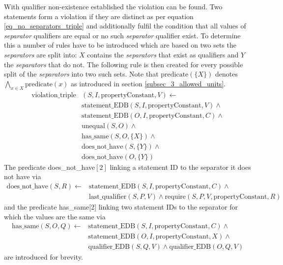 \documentclass[hyperref,bachelorofscience,fleqn]{cgvpub}
\begin{document}
With qualifier non-existence established the violation can be found. Two statements form a violation if they are distinct as per equation \ref{eq_no_separators_triple} and additionally fulfil the condition that all values of \emph{separator} qualifiers are equal or no such \emph{separator} qualifier exist. To determine this a number of rules have to be introduced which are based on two sets the \emph{separators} are split into: \(X\) contains the \emph{separators} that exist as qualifiers and \(Y\) the \emph{separators} that do not. The following rule is then created for every possible split of the \emph{separators} into two such sets. Note that \(\text{predicate}(\{X\})\) denotes \(\bigwedge_{x \in X} \text{predicate}(x)\) as introduced in section \ref{subsec_3_allowed_units}.
\begin{equation*}
\begin{split}
\text{violation\_triple}&(S, I, \text{propertyConstant}, V) \leftarrow \\
&\text{statement\_EDB}(S, I, \text{propertyConstant}, V) \wedge{} \\
&\text{statement\_EDB}(O, I, \text{propertyConstant}, C) \wedge{} \\
&\text{unequal}(S, O) \wedge{} \\
&\text{has\_same}(S, O, \{X\}) \wedge{} \\
&\text{does\_not\_have}(S, \{Y\}) \wedge{} \\
&\text{does\_not\_have}(O, \{Y\})
\end{split}
\end{equation*}
The predicate does\_not\_have\([2]\) linking a statement ID to the separator it does not have via 
\begin{equation*}
\begin{split}
\text{does\_not\_have}(S, R) \leftarrow &\text{statement\_EDB}(S, I, \text{propertyConstant}, C) \wedge{} \\
&\text{last\_qualifier}(S, P, V) \wedge \text{require}(S, P, V, \text{propertyConstant}, R)
\end{split}
\end{equation*}
and the predicate has\_same[2] linking two statement IDs to the separator for which the values are the same via
\begin{equation*}
\begin{split}
\text{has\_same}(S, O, Q) \leftarrow &\text{statement\_EDB}(S, I, \text{propertyConstant}, C) \wedge{} \\
&\text{statement\_EDB}(O, I, \text{propertyConstant}, X) \wedge{} \\
&\text{qualifier\_EDB}(S, Q, V) \wedge \text{qualifier\_EDB}(O, Q, V)
\end{split}
\end{equation*}
are introduced for brevity.
\end{document}
